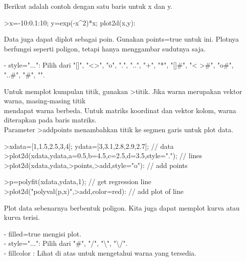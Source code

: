 \documentclass[a4paper,10pt]{article}
\begin{document}
\begin{eulernotebook}
\begin{eulercomment}
\begin{eulercomment}
\begin{eulercomment}
\begin{eulercomment}
\begin{eulercomment}
\begin{eulercomment}
\begin{eulercomment}
Berikut adalah contoh dengan satu baris untuk x dan y.
\end{eulercomment}
\begin{eulerprompt}
>x=-10:0.1:10; y=exp(-x^2)*x; plot2d(x,y):
\end{eulerprompt}
\begin{eulercomment}
Data juga dapat diplot sebagai poin. Gunakan points=true untuk ini.
Plotnya berfungsi seperti poligon, tetapi hanya menggambar sudutnya
saja.

- style="...": Pilih dari "[]", "\textless{}\textgreater{}", "o", ".", "..", "+", "*", "[]#",
"\textless{} \textgreater{}#", "o#", "..#", "#", "\textbar{}".

Untuk memplot kumpulan titik, gunakan \textgreater{}titik. Jika warna merupakan
vektor warna, masing-masing titik\\
mendapat warna berbeda. Untuk matriks koordinat dan vektor kolom,
warna diterapkan pada baris matriks.\\
Parameter \textgreater{}addpoints menambahkan titik ke segmen garis untuk plot
data.
\end{eulercomment}
\begin{eulerprompt}
>xdata=[1,1.5,2.5,3,4]; ydata=[3,3.1,2.8,2.9,2.7]; // data
>plot2d(xdata,ydata,a=0.5,b=4.5,c=2.5,d=3.5,style="."); // lines
>plot2d(xdata,ydata,>points,>add,style="o"): // add points
\end{eulerprompt}
\begin{eulerprompt}
>p=polyfit(xdata,ydata,1); // get regression line
>plot2d("polyval(p,x)",>add,color=red): // add plot of line
\end{eulerprompt}
\begin{eulercomment}
Plot data sebenarnya berbentuk poligon. Kita juga dapat memplot kurva
atau kurva terisi.

- filled=true mengisi plot.\\
- style="...": Pilih dari "#", "/", "\textbackslash{}", "\textbackslash{}/".\\
- fillcolor : Lihat di atas untuk mengetahui warna yang tersedia.


\end{eulercomment}
\end{eulercomment}
\end{eulercomment}
\end{eulercomment}
\end{eulercomment}
\end{eulercomment}
\end{eulercomment}
\end{eulernotebook}
\end{document}

